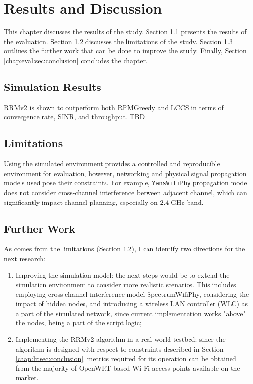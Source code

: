 \chapter{Results and Discussion}
\label{chap:eval}

This chapter discusses the results of the study.
Section \ref{chap:eval:sec:results} presents the results of the evaluation. Section \ref{chap:eval:sec:limitations} discusses the limitations of the study. Section \ref{chap:eval:sec:further_work} outlines the further work that can be done to improve the study. Finally, Section \ref{chap:eval:sec:conclusion} concludes the chapter.

\section{Simulation Results}
\label{chap:eval:sec:results}
RRMv2 is shown to outperform both RRMGreedy and LCCS in terms of convergence rate, SINR, and throughput.
TBD

\section{Limitations}
\label{chap:eval:sec:limitations}

Using the simulated environment provides a controlled and reproducible environment for evaluation, however, networking and physical signal propagation models used pose their constraints. For example, \texttt{YansWifiPhy} propagation model does not consider cross-channel interference between adjacent channel, which can significantly impact channel planning, especially on 2.4 GHz band.

\section{Further Work}
\label{chap:eval:sec:further_work}
As comes from the limitations (Section \ref{chap:eval:sec:limitations}), I can identify two directions for the next research:
\begin{enumerate}
    \item Improving the simulation model: the next steps would be to extend the simulation environment to consider more realistic scenarios. This includes employing cross-channel interference model SpectrumWifiPhy, considering the impact of hidden nodes, and introducing a wireless LAN controller (WLC) as a part of the simulated network, since current implementation works "above" the nodes, being a part of the script logic;
    \item Implementing the RRMv2 algorithm in a real-world testbed: since the algorithm is designed with respect to constraints described in Section \ref{chap:lr:sec:conclusion}, metrics required for its operation can be obtained from the majority of OpenWRT-based Wi-Fi access points available on the market.
\end{enumerate}

